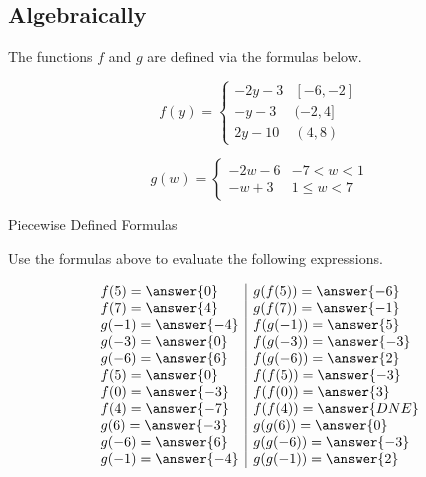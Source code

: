 \documentclass{ximera}
\begin{document}
\subsection*{Algebraically}


The functions $f$ and $g$ are defined via the formulas below.






\[
f(y) = 
\begin{cases}
  -2y-3 &  [-6, -2]   \\
  -y-3 &  (-2, 4]  \\
  2y - 10 & (4,8)
\end{cases}
\]












\[
g(w) = 
\begin{cases}
  -2w-6 &   -7 < w < 1 \\
  -w+3 &  1 \leq w < 7
\end{cases}
\]












\begin{question} Piecewise Defined Formulas

Use the formulas above to evaluate the following expressions.



\[
\begin{array}{l|l}
f(5) = \answer{0}  & g(f(5)) = \answer{-6}   \\
f(7) = \answer{4}  & g(f(7)) = \answer{-1}   \\
g(-1) = \answer{-4}  & f(g(-1)) = \answer{5}   \\
g(-3) = \answer{0}  & f(g(-3)) = \answer{-3}   \\
g(-6) = \answer{6}  & f(g(-6)) = \answer{2}   \\
f(5) = \answer{0}  & f(f(5)) = \answer{-3}   \\
f(0) = \answer{-3}  & f(f(0)) = \answer{3}   \\
f(4) = \answer{-7}  & f(f(4)) = \answer{DNE}   \\
g(6) = \answer{-3}  & g(g(6)) = \answer{0}   \\
g(-6) = \answer{6}  & g(g(-6)) = \answer{-3}   \\
g(-1) = \answer{-4}  & g(g(-1)) = \answer{2}   \\
\end{array}
\]



\end{question}
\end{document}
